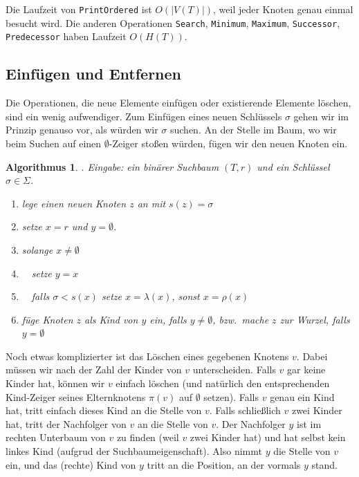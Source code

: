 \documentclass[10pt,reqno]{amsart}
\numberwithin{equation}{section}
\newtheorem{algorithm}[definition]{Algorithmus}
\begin{document}
Die Laufzeit von {\tt PrintOrdered} ist $O(|V(T)|)$, weil jeder Knoten genau einmal besucht wird.
Die anderen Operationen {\tt Search}, {\tt Minimum}, {\tt Maximum}, {\tt Successor}, {\tt Predecessor} haben Laufzeit $O(H(T))$.

\subsection{Einf\"ugen und Entfernen}\label{sec_binary_insert}

Die Operationen, die neue Elemente einf\"ugen oder existierende Elemente l\"oschen, sind ein wenig aufwendiger.
Zum Einf\"ugen eines neuen Schl\"ussels $\sigma$ gehen wir im Prinzip genauso vor, als w\"urden wir $\sigma$ suchen.
An der Stelle im Baum, wo wir beim Suchen auf einen $\emptyset$-Zeiger sto\ss en w\"urden, f\"ugen wir den neuen Knoten ein.

\begin{algorithm}. {\em Eingabe:} ein bin\"arer Suchbaum $(T,r)$ und ein Schl\"ussel $\sigma\in\Sigma$.\label{alg_insert}
	\begin{enumerate}
		\item lege einen neuen Knoten $z$ an mit $s(z)=\sigma$
		\item setze $x=r$ und $y=\emptyset$.
		\item solange $x\neq\emptyset$
		\item $\quad$setze $y=x$
		\item $\quad$falls $\sigma<s(x)$ setze $x=\lambda(x)$, sonst $x=\rho(x)$
		\item f\"uge Knoten $z$ als Kind von $y$ ein, falls $y\neq\emptyset$, bzw.\ mache $z$ zur Wurzel, falls $y=\emptyset$
	\end{enumerate}
\end{algorithm}

Noch etwas komplizierter ist das L\"oschen eines gegebenen Knotens $v$.
Dabei m\"ussen wir nach der Zahl der Kinder von $v$ unterscheiden.
Falls $v$ gar keine Kinder hat, k\"onnen wir $v$ einfach l\"oschen (und nat\"urlich den entsprechenden Kind-Zeiger seines Elternknotens $\pi(v)$ auf $\emptyset$ setzen).
Falls $v$ genau ein Kind hat, tritt einfach dieses Kind an die Stelle von $v$.
Falls schlie\ss lich $v$ zwei Kinder hat, tritt der Nachfolger von $v$ an die Stelle von $v$.
Der Nachfolger $y$ ist im rechten Unterbaum von $v$ zu finden (weil $v$ zwei Kinder hat) und hat selbst kein linkes Kind (aufgrud der Suchbaumeigenschaft).
Also nimmt $y$ die Stelle von $v$ ein, und das (rechte) Kind von $y$ tritt an die Position, an der vormals $y$ stand.
\end{document}
